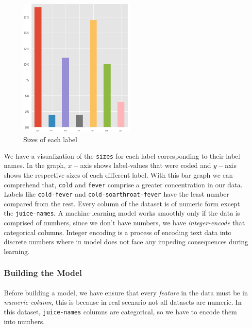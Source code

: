 \documentclass[letterpaper, 11pt]{article}
\begin{document}
\begin{figure}
\begin{center}
\includegraphics[width=58mm,scale=3]{sizez.png}
\caption{Sizes of each label}
\end{center}
\end{figure}

We have a visualization of the \texttt{sizes} for each label corresponding to their label names. In the graph, $x-$axis shows label-values that were coded and $y-$axis shows the respective sizes of each different label. With this bar graph we can comprehend that, \texttt{cold} and \texttt{fever} comprise a greater concentration in our data. Labels like \texttt{cold-fever} and \texttt{cold-soarthroat-fever} have the least number compared from the rest. Every column of the dataset is of numeric form except the \texttt{juice-names}. A machine learning model works smoothly only if the data is comprised of numbers, since we don't have numbers, we have \textit{integer-encode} that categorical columns. Integer encoding is a process of encoding text data into discrete numbers where in model does not face any impeding consequences during learning.

\subsubsection*{Building the Model}
\paragraph{} Before building a model, we have ensure that every \textit{feature} in the data must be in \textit{numeric-column}, this is because in real scenario not all datasets are numeric. In this dataset, \texttt{juice-names} columns are categorical, so we have to encode them into numbers. 
\end{document}
